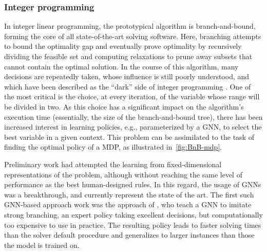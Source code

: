 \documentclass[twoside,11pt]{article}
\begin{document}
\subsubsection{Integer programming}
In integer linear programming, the prototypical algorithm is branch-and-bound, forming the core of all state-of-the-art solving software. Here, branching attempts to bound the optimality gap and eventually prove optimality by recursively dividing the feasible set and computing relaxations to prune away subsets that cannot contain the optimal solution. In the course of this algorithm, many decisions are repeatedly taken, whose influence is still poorly understood, and which have been described as the ``dark'' side of integer programming \citep{lodi2013heuristic}. One of the most critical is the choice, at every iteration, of the variable whose range will be divided in two. As this choice has a significant impact on the algorithm's execution time (essentially, the size of the branch-and-bound tree), there has been increased interest in learning policies, e.g., parameterized by a GNN, to select the best variable in a given context. This problem can be assimilated to the task of finding the optimal policy of a MDP, as illustrated in~\cref{fig:BnB-mdp}. 

Preliminary work had attempted the learning from fixed-dimensional representations of the problem, although without reaching the same level of performance as the best human-designed rules. In this regard, the usage of GNNs was a breakthrough, and currently represent the state of the art. The first such GNN-based approach work was the approach of \citet{Gas+2019}, who teach a GNN to imitate strong branching, an expert policy taking excellent decisions, but computationally too expensive to use in practice. The resulting policy leads to faster solving times than the solver default procedure and generalizes to larger instances than those the model is trained on.
\end{document}
